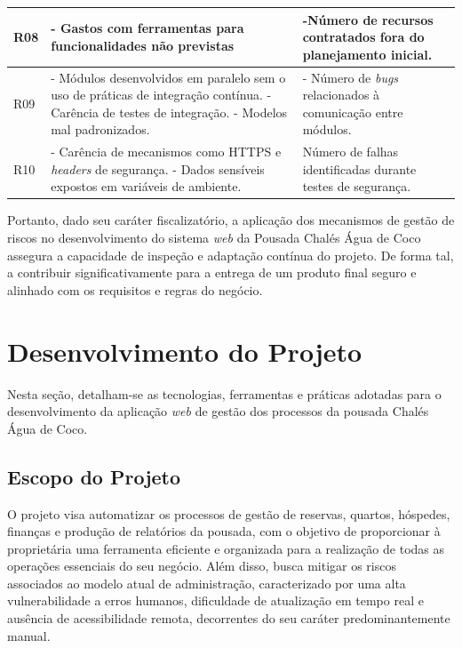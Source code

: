 \documentclass[
	12pt,				%
	openany,			%
	twoside,			%
	a4paper,			%
	english,			%
	french,				%
	spanish,			%
	brazil				%
	]{abntex2}
\begin{document}
\begin{quadro}[H]
\begin{tabular} {|p{3cm}|p{6cm}|p{6cm}|}
		\\
		\hline
		R08 & 
		- Gastos com ferramentas para funcionalidades não previstas
		& -Número de recursos contratados fora do planejamento inicial.
		\\
		\hline
		R09 & 
		- Módulos desenvolvidos em paralelo sem o uso de práticas de integração contínua. \newline
		- Carência de testes de integração. \newline
		- Modelos mal padronizados.
		& - Número de \textit{bugs} relacionados à comunicação entre módulos.
		\\
		\hline
		R10 & 
		- Carência de mecanismos como HTTPS e \textit{headers} de segurança. \newline
		- Dados sensíveis expostos em variáveis de ambiente.
		& Número de falhas identificadas durante testes de segurança.
		\\ \hline
	\end{tabular}
\end{quadro}

Portanto, dado seu caráter fiscalizatório, a aplicação dos mecanismos de  gestão de riscos no desenvolvimento do sistema \textit{web} da Pousada Chalés Água de Coco assegura a capacidade de inspeção e adaptação contínua do projeto. De forma tal, a contribuir significativamente para a entrega de um produto final seguro e alinhado com os requisitos e regras do negócio. 


\chapter{Desenvolvimento do Projeto}
Nesta seção, detalham-se as tecnologias, ferramentas e práticas adotadas para o desenvolvimento da aplicação \textit{web} de gestão dos processos da pousada Chalés Água de Coco.

\section{Escopo do Projeto}
O projeto visa automatizar os processos de gestão de reservas, quartos, hóspedes, finanças e produção de relatórios da pousada, com o objetivo de proporcionar à proprietária uma ferramenta eficiente e organizada para a realização de todas as operações essenciais do seu negócio. Além disso, busca mitigar os riscos associados ao modelo atual de administração, caracterizado por uma alta vulnerabilidade a erros humanos, dificuldade de atualização em tempo real e ausência de acessibilidade remota, decorrentes do seu caráter predominantemente manual.
\end{document}
